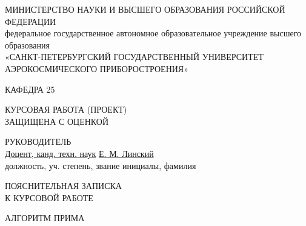 \documentclass[a4paper,16pt]{article}
\begin{document}
\onehalfspacing

\begin{center}
    {МИНИСТЕРСТВО НАУКИ И ВЫСШЕГО ОБРАЗОВАНИЯ РОССИЙСКОЙ ФЕДЕРАЦИИ} \\
    федеральное государственное автономное образовательное учреждение высшего образования \\
    {«САНКТ-ПЕТЕРБУРГСКИЙ ГОСУДАРСТВЕННЫЙ УНИВЕРСИТЕТ АЭРОКОСМИЧЕСКОГО ПРИБОРОСТРОЕНИЯ»} \\
\end{center}

\vspace{0.5cm}

\begin{center}
    {КАФЕДРА 25} \\
\end{center}

\vspace{1cm}

\begin{flushleft}
    КУРСОВАЯ РАБОТА (ПРОЕКТ) \\
    ЗАЩИЩЕНА С ОЦЕНКОЙ \\
\end{flushleft}

\begin{flushleft}
    РУКОВОДИТЕЛЬ \\
    \underline{Доцент, канд. техн. наук} 
    \qquad \qquad \qquad \qquad \qquad \qquad \qquad \qquad \qquad \qquad \qquad \qquad \qquad \qquad \underline{Е. М. Линский}\\
    должность, уч. степень, звание 
    \qquad \qquad \qquad \qquad{}
    \qquad \qquad \qquad \qquad \qquad инициалы, фамилия
\end{flushleft}

\vspace{1cm}

\begin{center}
    ПОЯСНИТЕЛЬНАЯ ЗАПИСКА\\
    К КУРСОВОЙ РАБОТЕ \\
\end{center}

\vspace{1cm}

\begin{center}
    АЛГОРИТМ ПРИМА \\
\end{center}

\vspace{1cm}
\end{document}
